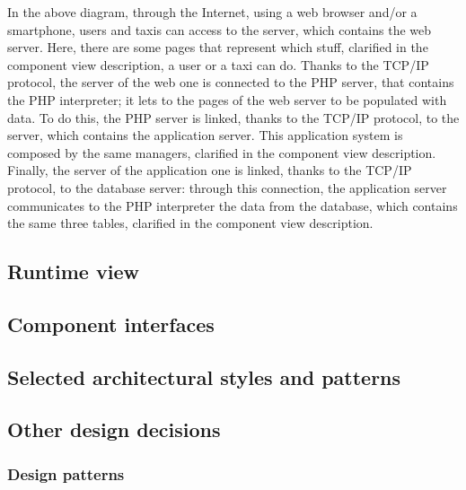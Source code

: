 	In the above diagram, through the Internet, using a web browser and/or a smartphone, users and taxis can access to the server, which contains the web server. Here, there are some pages that represent which stuff, clarified in the component view description, a user or a taxi can do.
	Thanks to the TCP/IP protocol, the server of the web one is connected to the PHP server, that contains the PHP interpreter; it lets to the pages of the web server to be populated with data. To do this, the PHP server is linked, thanks to the TCP/IP protocol, to the server, which contains the application server. This application system is composed by the same managers, clarified in the component view description. 
	Finally, the server of the application one is linked, thanks to the TCP/IP protocol, to the database server: through this connection, the application server communicates to the PHP interpreter the data from the database, which contains the same three tables, clarified in the component view description. 
\subsection{Runtime view}
\subsection{Component interfaces}
\subsection{Selected architectural styles and patterns}
\subsection{Other design decisions}
	\subsubsection{Design patterns}